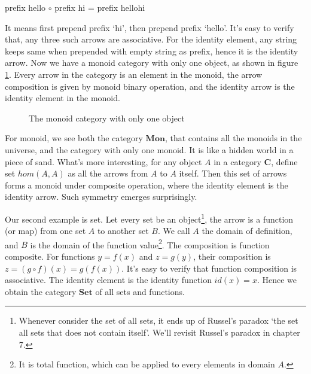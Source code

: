 \documentclass[b5paper]{article}
\begin{document}
\begin{center}
prefix hello $\circ$ prefix hi = prefix hellohi
\end{center}

It means first prepend prefix `hi', then prepend prefix `hello'. It's easy to verify that, any three such arrows are associative. For the identity element, any string keeps same when prepended with empty string as prefix, hence it is the identity arrow. Now we have a monoid category with only one object, as shown in figure \ref{fig:monoid-as-category}. Every arrow in the category is an element in the monoid, the arrow composition is given by monoid binary operation, and the identity arrow is the identity element in the monoid.

\begin{figure}[htbp]
\centering
{}
\caption{The monoid category with only one object}
\label{fig:monoid-as-category}
\end{figure}

For monoid, we see both the category $\pmb{Mon}$, that contains all the monoids in the universe, and the category with only one monoid. It is like a hidden world in a piece of sand. What's more interesting, for any object $A$ in a category $\pmb{C}$, define set $hom(A, A)$ as all the arrows from $A$ to $A$ itself. Then this set of arrows forms a monoid under composite operation, where the identity element is the identity arrow. Such symmetry emerges surprisingly.

Our second example is set. Let every set be an object\footnote{Whenever consider the set of all sets, it ends up of Russel's paradox `the set all sets that does not contain itself'. We'll revisit Russel's paradox in chapter 7.}, the arrow is a function (or map) from one set $A$ to another set $B$. We call $A$ the domain of definition, and $B$ is the domain of the function value\footnote{It is total function, which can be applied to every elements in domain $A$.}. The composition is function composite. For functions $y = f(x)$ and $z = g(y)$, their composition is $z = (g \circ f)(x) = g(f(x))$. It's easy to verify that function composition is associative. The identity element is the identity function $id(x) = x$. Hence we obtain the category $\pmb{Set}$ of all sets and functions.
\end{document}
